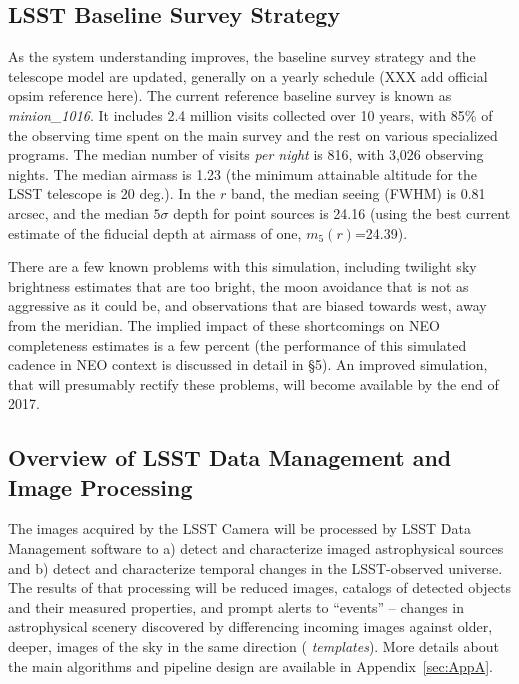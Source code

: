 \subsection{LSST Baseline Survey Strategy}

As the system understanding improves, the baseline survey strategy and the telescope model 
are updated, generally on a yearly schedule (XXX add official opsim reference here). The current 
reference baseline survey is known as {\it minion\_1016}. It includes 2.4
million visits collected over 10 years, with 85\% of the observing time spent on the 
main survey and the rest on various specialized programs. The median number of visits
{\it per night} is 816, with 3,026 observing nights. The median airmass is 1.23 (the
minimum attainable altitude for the LSST telescope is 20 deg.). In the $r$ band, the median 
seeing (FWHM) is 0.81 arcsec, and the median $5\sigma$ depth for point sources is 24.16 
(using the best current estimate of the fiducial depth at airmass of one, $m_5(r)$=24.39). 

There are a few known problems with this simulation, including twilight sky brightness
estimates that are too bright, the moon avoidance that is not as aggressive as it could be,
and observations that are biased towards west, away from the meridian. The implied impact
of these shortcomings on NEO completeness estimates is a few percent (the performance 
of this simulated cadence in NEO context is discussed in detail in \S5). An improved simulation, 
that will presumably rectify these problems, will become available by the end of 2017. 


\subsection{Overview of LSST  Data Management and Image Processing} 

The images acquired by the LSST Camera will be processed by LSST Data Management
software \citep{juric15} to a) detect and characterize imaged
astrophysical sources and b) detect and characterize temporal changes
in the LSST-observed universe. The results of that processing will be
reduced images, catalogs of detected objects and their measured properties, and 
prompt alerts to ``events'' -- changes in astrophysical scenery discovered by differencing 
incoming images against older, deeper, images of the sky in the same direction ({\em
templates}). More details about the main algorithms and pipeline design are available
in Appendix~\ref{sec:AppA}. 

